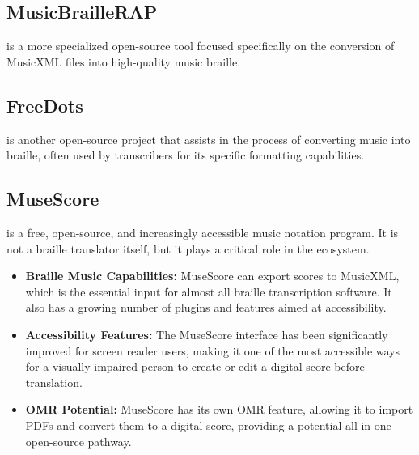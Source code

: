 \subsection{MusicBrailleRAP}\label{ch10:ssec:musicbraillerap}
 is a more specialized open-source tool focused specifically on the conversion of \gls{MusicXML} files into high-quality music braille.

\subsection{FreeDots}\label{ch10:ssec:freedots}
 is another open-source project that assists in the process of converting music into braille, often used by transcribers for its specific formatting capabilities.

\subsection{MuseScore}\label{ch10:ssec:musescore}
 is a free, open-source, and increasingly accessible music notation program. It is not a braille translator itself, but it plays a critical role in the ecosystem.
\begin{itemize}
	\item \textbf{Braille Music Capabilities:} MuseScore can export scores to \gls{MusicXML}, which is the essential input for almost all braille transcription software. It also has a growing number of plugins and features aimed at accessibility.
	\item \textbf{Accessibility Features:} The MuseScore interface has been significantly improved for screen reader users, making it one of the most accessible ways for a visually impaired person to create or edit a digital score before translation.
	\item \textbf{OMR Potential:} MuseScore has its own \gls{OMR} feature, allowing it to import PDFs and convert them to a digital score, providing a potential all-in-one open-source pathway.
\end{itemize}

